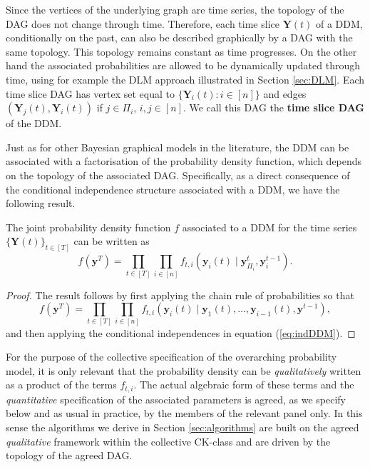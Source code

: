 Since the vertices of the underlying graph are time series, the topology of the DAG does not change through time. Therefore, each time slice $\bm{Y}(t)$ of a DDM, conditionally on the past, can also be described graphically by a DAG with the same topology. This topology remains constant as time progresses. On the other hand the associated probabilities are allowed to be dynamically updated through time, using for example the DLM approach illustrated in Section \ref{sec:DLM}. Each  time slice DAG has vertex set equal to $\{\bm{Y}_i(t):i\in[n]\}$ and edges $\left(\bm{Y}_j(t),\bm{Y}_i(t)\right)$ if $j\in\Pi_i$, $i,j\in[n]$. We call this DAG the \textbf{time slice DAG} of the DDM. 

Just as for other Bayesian graphical models in the literature, the DDM can be associated with a factorisation of the probability density function, which depends on the topology of the associated DAG. Specifically, as a direct consequence of the conditional independence structure associated with a DDM, we have the following result.
 
\begin{proposition}
\label{prop1}
The joint probability density function $f$ associated to a DDM for the time series $\{\bm{Y}(t)\}_{t\in [T]}$ can be written as
\begin{equation*}
\label{fact}
f\left(\bm{y}^T\right)=\prod_{t\in[T]}\prod_{i\in[n]} f_{t,i}\left(\bm{y}_i(t)\;|\;\bm{y}_{\Pi_i}^t,\bm{y}^{t-1}_i\right).
\end{equation*}
\end{proposition}
\begin{proof}
The result follows by first applying the chain rule of probabilities so that 
\begin{equation*}
f(\bm{y}^T)=\prod_{t\in[T]}\prod_{i\in[n]}f_{t,i}(\bm{y}_i(t)\;|\;\bm{y}_1(t),\dots,\bm{y}_{i-1}(t),\bm{y}^{t-1}),
\end{equation*}
and then applying the conditional independences in equation (\ref{eq:indDDM}).
\end{proof}

For the purpose of the collective specification of the overarching probability model,   it is only relevant that the probability density can be \textit{qualitatively} written as a product of the terms $f_{t,i}$. The actual algebraic form of these terms and the \textit{quantitative} specification of the associated parameters is agreed, as we specify below and as usual in practice, by the members of the relevant panel only.  In this sense the algorithms we derive in Section \ref{sec:algorithms} are built on the agreed \textit{qualitative} framework within the collective CK-class and are driven by the topology of the agreed DAG.

